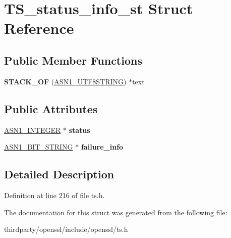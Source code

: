 \hypertarget{struct_t_s__status__info__st}{}\section{T\+S\+\_\+status\+\_\+info\+\_\+st Struct Reference}
\label{struct_t_s__status__info__st}
\subsection*{Public Member Functions}
\begin{DoxyCompactItemize}
\item 
\mbox{\label{struct_t_s__status__info__st_ac071c90d1bf6dd456780338a417ba9e2}} 
{\bfseries S\+T\+A\+C\+K\+\_\+\+OF} (\hyperlink{structasn1__string__st}{A\+S\+N1\+\_\+\+U\+T\+F8\+S\+T\+R\+I\+NG}) $\ast$text
\end{DoxyCompactItemize}
\subsection*{Public Attributes}
\begin{DoxyCompactItemize}
\item 
\mbox{\label{struct_t_s__status__info__st_a1bbc97b14de94cd43623becfd70a254e}} 
\hyperlink{structasn1__string__st}{A\+S\+N1\+\_\+\+I\+N\+T\+E\+G\+ER} $\ast$ {\bfseries status}
\item 
\mbox{\label{struct_t_s__status__info__st_a20343fe14840039fb382b1b08da0104d}} 
\hyperlink{structasn1__string__st}{A\+S\+N1\+\_\+\+B\+I\+T\+\_\+\+S\+T\+R\+I\+NG} $\ast$ {\bfseries failure\+\_\+info}
\end{DoxyCompactItemize}


\subsection{Detailed Description}


Definition at line 216 of file ts.\+h.



The documentation for this struct was generated from the following file\+:\begin{DoxyCompactItemize}
\item 
thirdparty/openssl/include/openssl/ts.\+h\end{DoxyCompactItemize}
